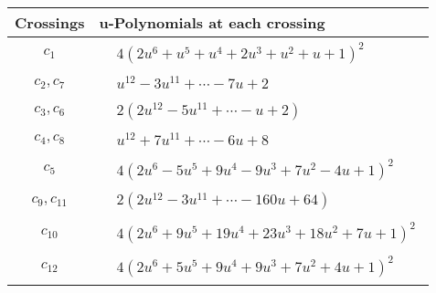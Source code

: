 \documentclass[1p]{elsarticle_modified}
\theoremstyle{definition}
\begin{document}
\begin{tabular}{m{50pt}|m{274pt}}
Crossings & \hspace{64pt}u-Polynomials at each crossing \\
\hline $$\begin{aligned}c_{1}\end{aligned}$$&$\begin{aligned}
&4(2 u^6+u^5+u^4+2 u^3+u^2+u+1)^2
\end{aligned}$\\
\hline $$\begin{aligned}c_{2},c_{7}\end{aligned}$$&$\begin{aligned}
&u^{12}-3 u^{11}+\cdots-7 u+2
\end{aligned}$\\
\hline $$\begin{aligned}c_{3},c_{6}\end{aligned}$$&$\begin{aligned}
&2(2 u^{12}-5 u^{11}+\cdots- u+2)
\end{aligned}$\\
\hline $$\begin{aligned}c_{4},c_{8}\end{aligned}$$&$\begin{aligned}
&u^{12}+7 u^{11}+\cdots-6 u+8
\end{aligned}$\\
\hline $$\begin{aligned}c_{5}\end{aligned}$$&$\begin{aligned}
&4(2 u^6-5 u^5+9 u^4-9 u^3+7 u^2-4 u+1)^2
\end{aligned}$\\
\hline $$\begin{aligned}c_{9},c_{11}\end{aligned}$$&$\begin{aligned}
&2(2 u^{12}-3 u^{11}+\cdots-160 u+64)
\end{aligned}$\\
\hline $$\begin{aligned}c_{10}\end{aligned}$$&$\begin{aligned}
&4(2 u^6+9 u^5+19 u^4+23 u^3+18 u^2+7 u+1)^2
\end{aligned}$\\
\hline $$\begin{aligned}c_{12}\end{aligned}$$&$\begin{aligned}
&4(2 u^6+5 u^5+9 u^4+9 u^3+7 u^2+4 u+1)^2
\end{aligned}$\\
\hline
\end{tabular}\\~\\
\end{document}
